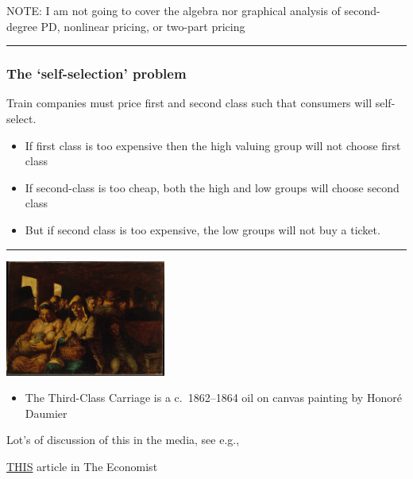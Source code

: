 \documentclass[]{article}
\providecommand{\tightlist}{%
  \setlength{\itemsep}{0pt}\setlength{\parskip}{0pt}}
\begin{document}
NOTE: I am not going to cover the algebra nor graphical analysis of
second-degree PD, nonlinear pricing, or two-part pricing

\begin{center}\rule{0.5\linewidth}{\linethickness}\end{center}

\hypertarget{the-self-selection-problem}{%
\subsubsection{The `self-selection'
problem}\label{the-self-selection-problem}}

Train companies must price first and second class such that consumers
will self-select.

\begin{itemize}
\item
  If first class is too expensive then the high valuing group will not
  choose first class
\item
  If second-class is too cheap, both the high and low groups will choose
  second class
\item
  But if second class is too expensive, the low groups will not buy a
  ticket.
\end{itemize}

\begin{center}\rule{0.5\linewidth}{\linethickness}\end{center}

\includegraphics[height=1.5in]{picsfigs/thirdclasscarriage.jpg}

\begin{itemize}
\tightlist
\item
  The Third-Class Carriage is a c.~1862--1864 oil on canvas painting by
  Honoré Daumier
\end{itemize}

\bigskip

Lot's of discussion of this in the media, see e.g.,

\href{https://www.1843magazine.com/ideas/the-daily/why-companies-make-their-products-worse}{THIS}
article in The Economist
\end{document}
